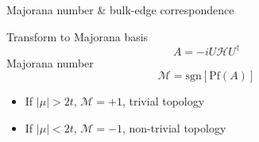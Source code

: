 \documentclass[xcolor=dvipsnames,10pt,aspectratio=169]{beamer}
\newcommand{\ham}{\mathcal{H}}
\begin{document}
  \begin{frame}{Majorana number \& bulk-edge correspondence}

    \small
    Transform to Majorana basis
    \begin{equation*}
      A = -i U \ham U^{\dagger}
    \end{equation*}
    Majorana number
    \begin{equation*}
      \mathcal{M} = \text{sgn}[\text{Pf}(A)]
    \end{equation*}


    \begin{itemize}
      \item If $|\mu| > 2t$, $\mathcal{M} = +1$, trivial topology
      \item If $|\mu| < 2t$, $\mathcal{M} = -1$, non-trivial topology
    \end{itemize}

    \begin{figure}
    \end{figure}

    \centering

  \end{frame}
\end{document}
